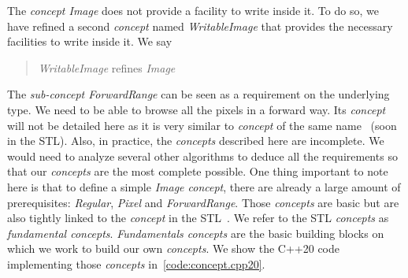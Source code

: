 The \emph{concept Image} does not provide a facility to write inside it. To do so, we have refined a second
\emph{concept} named \emph{WritableImage} that provides the necessary facilities to write inside it. We say
\blockquote{\emph{WritableImage} refines \emph{Image}}.

The \emph{sub-concept ForwardRange} can be seen as a requirement on the underlying type. We need to be able to browse
all the pixels in a forward way. Its \emph{concept} will not be detailed here as it is very similar to \emph{concept} of
the same name~\cite{niebler.2018.mergingranges,niebler.2018.deepranges} (soon in the STL). Also, in practice, the
\emph{concepts} described here are incomplete. We would need to analyze several other algorithms to deduce all the
requirements so that our \emph{concepts} are the most complete possible. One thing important to note here is that to
define a simple \emph{Image concept}, there are already a large amount of prerequisites:
\label{term:regular}\emph{Regular}, \emph{Pixel} and \emph{ForwardRange}. Those \emph{concepts} are basic but are also
tightly linked to the \emph{concept} in the STL~\cite{carter.2018.concepts}. We refer to the STL \emph{concepts} as
\emph{fundamental concepts}. \emph{Fundamentals concepts} are the basic building blocks on which we work to build our
own \emph{concepts}. We show the C++20 code implementing those \emph{concepts} in~\ref{code:concept.cpp20}.

